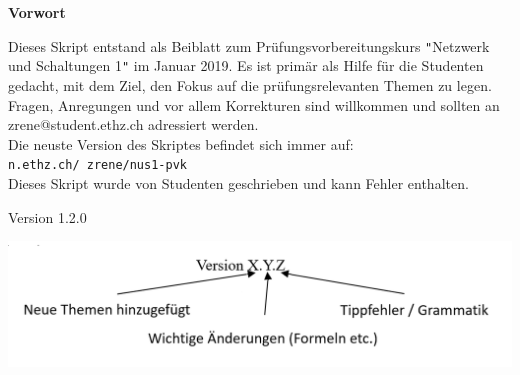 






 \begin{center}
 	\LARGE\textbf{Vorwort}
 \end{center}
 Dieses Skript entstand als Beiblatt zum Prüfungsvorbereitungskurs \texttt{"}Netzwerk und Schaltungen 1\texttt{"} im Januar 2019.
Es ist primär als Hilfe für die Studenten gedacht, mit dem Ziel, den Fokus auf die prüfungsrelevanten Themen zu legen.
	Fragen, Anregungen und vor allem Korrekturen sind willkommen und sollten an zrene@student.ethz.ch adressiert werden. \\
Die neuste Version des Skriptes befindet sich immer auf: \texttt{n.ethz.ch/~zrene/nus1-pvk}
\\
Dieses Skript wurde von Studenten geschrieben und kann Fehler enthalten.
\begin{center}
	Version 1.2.0
\end{center}
\begin{center}
	\hspace{1cm}
	\includegraphics[scale=0.48]{img/version.png}
\end{center}


\cleardoublepage
{}

\tableofcontents                %

\newpage


